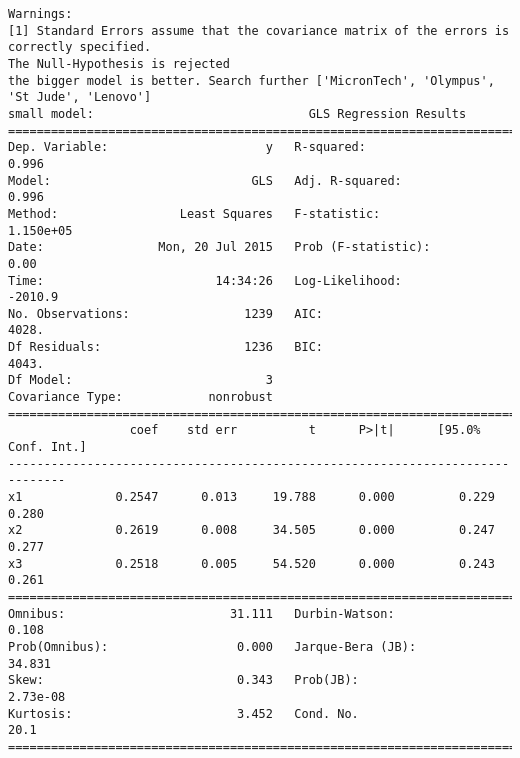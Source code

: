 \documentclass{article}
\begin{document}
\begin{verbatim}
Warnings:
[1] Standard Errors assume that the covariance matrix of the errors is correctly specified.
The Null-Hypothesis is rejected
the bigger model is better. Search further ['MicronTech', 'Olympus', 'St Jude', 'Lenovo']
small model:                              GLS Regression Results                            
==============================================================================
Dep. Variable:                      y   R-squared:                       0.996
Model:                            GLS   Adj. R-squared:                  0.996
Method:                 Least Squares   F-statistic:                 1.150e+05
Date:                Mon, 20 Jul 2015   Prob (F-statistic):               0.00
Time:                        14:34:26   Log-Likelihood:                -2010.9
No. Observations:                1239   AIC:                             4028.
Df Residuals:                    1236   BIC:                             4043.
Df Model:                           3                                         
Covariance Type:            nonrobust                                         
==============================================================================
                 coef    std err          t      P>|t|      [95.0% Conf. Int.]
------------------------------------------------------------------------------
x1             0.2547      0.013     19.788      0.000         0.229     0.280
x2             0.2619      0.008     34.505      0.000         0.247     0.277
x3             0.2518      0.005     54.520      0.000         0.243     0.261
==============================================================================
Omnibus:                       31.111   Durbin-Watson:                   0.108
Prob(Omnibus):                  0.000   Jarque-Bera (JB):               34.831
Skew:                           0.343   Prob(JB):                     2.73e-08
Kurtosis:                       3.452   Cond. No.                         20.1
==============================================================================


\end{verbatim}
\end{document}
